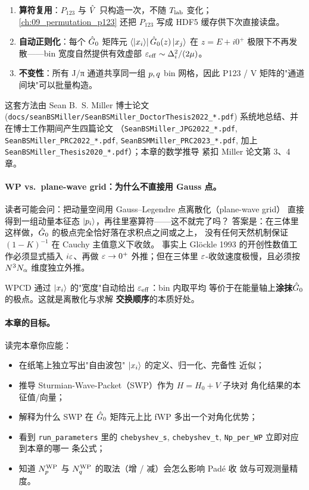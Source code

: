 \begin{enumerate}
  \item \textbf{算符复用}：\(P_{123}\) 与 \(\hat{V}\) 只构造一次，不随
        \({T_{\text{lab}}}\) 变化；\cref{ch:09_permutation_p123} 还把 \(P_{123}\) 写成
        HDF5 缓存供下次直接读盘。
  \item \textbf{自动正则化}：每个 \(\hat{G}_0\) 矩阵元
        \(\bra{\ket{x_{i}}}\hat{G}_0(z)\ket{x_{j}}\)
        在 \(z = E + i 0^+\) 极限下不再发散——bin 宽度自然提供有效虚部
        \(\varepsilon_{\rm eff} \sim \Delta_i^2 / (2\mu)\)。
  \item \textbf{不变性}：所有 J/π 通道共享同一组 \(p, q\) bin
        网格，因此 P123 / V 矩阵的"通道间块"可以批量构造。
\end{enumerate}

这套方法由 Sean B.~S. Miller 博士论文 (\texttt{docs/seanBSMiller/SeanBSMiller\_DoctorThesis2022\_*.pdf}) 系统地总结、并在博士工作期间产生四篇论文
（\texttt{SeanBSMiller\_JPG2022\_*.pdf}, \texttt{SeanBSMiller\_PRC2022\_*.pdf},
\texttt{SeanBSMMiller\_PRC2023\_*.pdf}, 加上 \texttt{SeanBSMiller\_Thesis2020\_*.pdf}）；本章的数学推导
紧扣 Miller 论文第 3、4 章。

\paragraph{WP vs.~plane-wave grid：为什么不直接用 Gauss 点。}
读者可能会问：把动量空间用 Gauss--Legendre 点离散化（plane-wave grid）
直接得到一组动量本征态 \(\ket{p_i}\)，再往里塞算符——这不就完了吗？
答案是：在三体里这样做，\(\hat{G}_0\) 的极点完全恰好落在求积点之间或之上，
没有任何天然机制保证 \((1 - K)^{-1}\) 在 Cauchy 主值意义下收敛。
事实上 Glöckle 1993 的开创性数值工作必须显式插入 \(i\varepsilon\)、再做
\(\varepsilon \to 0^+\) 外推；但在三体里 \(\varepsilon\)-收敛速度极慢，且必须按
\(N^3 N_\alpha\) 维度独立外推。

WPCD 通过 \(\ket{x_{i}}\) 的"宽度"自动给出 \(\varepsilon_{\rm eff}\)：bin 内取平均
等价于在能量轴上\textbf{涂抹}\(\hat{G}_0\) 的极点。这就是离散化与求解
\textbf{交换顺序}的本质好处。

\paragraph{本章的目标。}
读完本章你应能：
\begin{itemize}
  \item 在纸笔上独立写出"自由波包" \(\ket{x_{i}}\) 的定义、归一化、完备性
        近似；
  \item 推导 Sturmian-Wave-Packet（SWP）作为 \(H = H_0 + V\) 子块对
        角化结果的本征值/向量；
  \item 解释为什么 SWP 在 \(\hat{G}_0\) 矩阵元上比 fWP 多出一个对角化优势；
  \item 看到 \texttt{run\_parameters} 里的 \texttt{chebyshev\_s},
        \texttt{chebyshev\_t}, \texttt{Np\_per\_WP} 立即对应到本章的哪一
        条公式；
  \item 知道 \({N_{p}^{\text{WP}}}\) 与 \({N_{q}^{\text{WP}}}\) 的取法（增 / 减）会怎么影响 Padé 收
        敛与可观测量精度。
\end{itemize}


